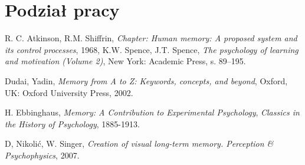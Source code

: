 \documentclass{pracamgr}
\begin{document}
\chapter{Podział pracy}

\begin{thebibliography}{99}

 R. C. Atkinson, R.M. Shiffrin, \textit{Chapter: Human memory: A proposed system and its control processes}, 1968, K.W. Spence, J.T. Spence, \textit{The psychology of learning and motivation (Volume 2)}, New York: Academic Press, s. 89–195.

 Dudai, Yadin, \textit{Memory from A to Z: Keywords, concepts, and beyond}, Oxford, UK: Oxford University Press, 2002.

 H. Ebbinghaus, \textit{Memory: A Contribution to Experimental Psychology}, \textit{Classics in the History of Psychology}, 1885-1913.


 D, Nikolić, W. Singer, \textit{Creation of visual long-term memory. Perception \& Psychophysics}, 2007.


\end{thebibliography}
\end{document}
